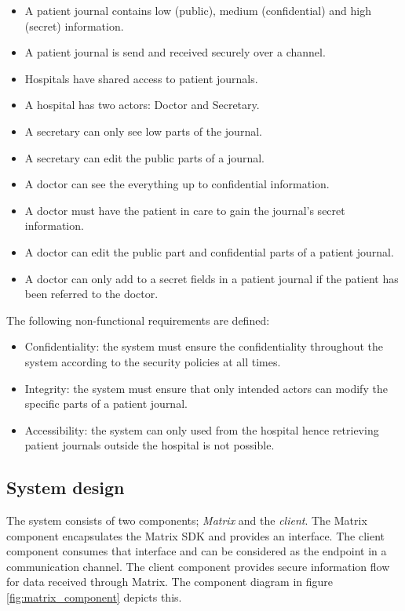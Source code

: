 \begin{itemize}
	\item A patient journal contains low (public), medium (confidential) and high (secret)  information.
	\item A patient journal is send and received securely over a channel.
	\item Hospitals have shared access to patient journals. 
	\item A hospital has two actors: Doctor and Secretary.
	\item A secretary can only see low parts of the journal.
	\item A secretary can edit the public parts of a journal.
	\item A doctor can see the everything up to confidential information.
	\item A doctor must have the patient in care to gain the journal's secret information.
	\item A doctor can edit the public part and confidential parts of a patient journal.
	\item A doctor can only add to a secret fields in a patient journal if the patient has been referred to the doctor.
\end{itemize}

The following non-functional requirements are defined:

\begin{itemize}
	\item Confidentiality: the system must ensure the confidentiality throughout the system according to the security policies at all times.
	\item Integrity: the system must ensure that only intended actors can modify the specific parts of a patient journal.
	\item Accessibility: the system can only used from the hospital hence retrieving patient journals outside the hospital is not possible.
\end{itemize}


\subsection{System design}


The system consists of two components; \emph{Matrix} and the \emph{client}. The Matrix component encapsulates the Matrix SDK and provides an interface. The client component consumes that interface and can be considered as the endpoint in a communication channel. The client component provides secure information flow for data received through Matrix. 
The component diagram in figure \ref{fig:matrix_component} depicts this.

